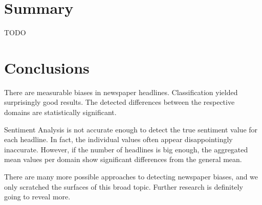 \documentclass[final]{ieee}
\begin{document}
\section{Summary}
TODO

\section{Conclusions}
There are measurable biases in newspaper headlines. Classification yielded surprisingly good results. The detected differences between the respective domains are statistically significant.

Sentiment Analysis is not accurate enough to detect the true sentiment value for each headline. In fact, the individual values often appear disappointingly inaccurate. However, if the number of headlines is big enough, the aggregated mean values per domain show significant differences from the general mean.

There are many more possible approaches to detecting newspaper biases, and we only scratched the surfaces of this broad topic. Further research is definitely going to reveal more. %



           
\end{document}
